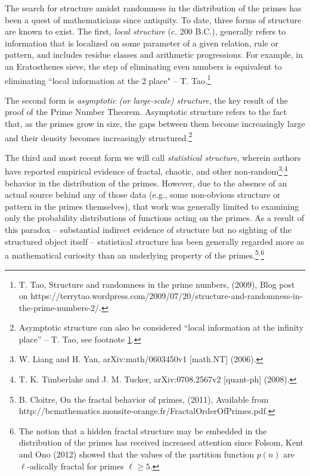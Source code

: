 \documentclass[12pt,longtitle,times]{amsart}
\begin{document}
The search for structure amidst randomness in the distribution of the primes has been a quest of mathematicians since antiquity. To date, three forms of structure are known to exist. The first, \textit{local structure} (c. 200 B.C.), generally refers to information that is localized on some parameter of a given relation, rule or pattern, and includes residue classes\cite{Granville-Different-Approaches-2009,Tao_The-Dichotomy-ICM2005} and arithmetic progressions\cite{Green-ARbitr-long-ARITH-2008,Tao-ARbitr-long-poly-2008}. For example, in an Eratosthenes sieve, the step of eliminating even numbers is equivalent to eliminating ``local information at the 2 place" -- T. Tao.\footnote{\label{Tao-structure-randomness2009}T. Tao, Structure and randomness in the prime numbers, (2009), Blog post on https://terrytao.wordpress.com/2009/07/20/structure-and-randomness-in-the-prime-numbers-2/.}

The second form is \textit{asymptotic (or large-scale) structure}, the key result of the proof of the Prime Number Theorem. Asymptotic structure refers to the fact that, as the primes grow in size, the gaps between them become increasingly large and their density becomes increasingly structured.\cite{Goldstein-1973}\footnote{Asymptotic structure can also be considered ``local information at the infinity place'' -- T. Tao, see footnote \ref{Tao-structure-randomness2009}.}

The third and most recent form we will call \textit{statistical structure}, wherein authors have reported empirical evidence of fractal\cite{Cattani-Fractal-2010}, chaotic\cite{Bershadskii-Hidden-2011,Wolf1996}, and other non-random\cite{Ares-Hidden-2006,Holdom-Scale-Invariant-2009,Selvam-Universal-2014,Szpiro-TheGaps-2004,Szpiro-Peaks-and_Gaps-2007}\footnote{\label{Liang2006}W. Liang and H. Yan, arXiv:math/0603450v1 [math.NT] (2006).}$^,$\footnote{\label{Timberlake2008}T. K. Timberlake and J. M. Tucker, arXiv:0708.2567v2 [quant-ph] (2008).} behavior in the distribution of the primes. However, due to the absence of an actual source behind any of those data (e.g., some non-obvious structure or pattern in the primes themselves), that work was generally limited to examining only the probability distributions of functions acting on the primes.\cite{Bershadskii-Hidden-2011,Dahmen-Similarity-In-The-Statistics-2001,Szpiro-TheGaps-2004,Szpiro-Peaks-and_Gaps-2007} As a result of this paradox -- substantial indirect evidence of structure but no sighting of the structured object itself -- statistical structure has been generally regarded more as a mathematical curiosity than an underlying property of the primes.\footnote{\label{Cloitre2011}B. Cloitre, On the fractal behavior of primes, (2011), Available from http://bcmathematics.monsite-orange.fr/FractalOrderOfPrimes.pdf.}$^,$\footnote{The notion that a hidden fractal structure may be embedded in the distribution of the primes has received increased attention since Folsom, Kent and Ono (2012) showed that the values of the partition function $p(n)$ are $\ell$-adically fractal for primes $\ell \geq 5$.\cite{Bruinier-Algebraic-2013,Folsom-L-Adic-2012}}
\end{document}
